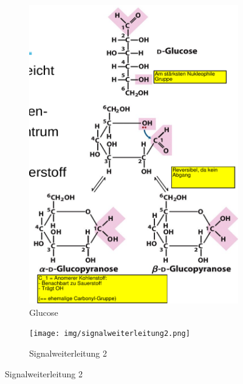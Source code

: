 \documentclass[a4paper,twocolumn,usegeometry,english,fontsize=6,DIV=16]{scrartcl}
\begin{document}
\begin{figure}
	\centering
	\begin{subfigure}{.5\linewidth}
		\centering
		\includegraphics[width=\linewidth]{img/glucose.png}
		\caption{Glucose}
	\end{subfigure}%
	\begin{subfigure}{.5\linewidth}
		\centering
		\texttt{[image: img/signalweiterleitung2.png]}
		\caption{Signalweiterleitung 2}
	\end{subfigure}%
\end{figure}
\end{document}
